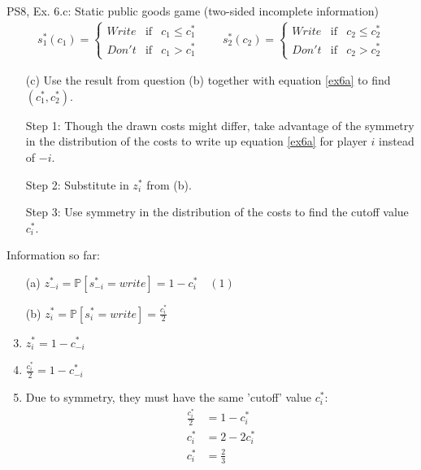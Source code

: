 \begin{frame}{PS8, Ex. 6.c: Static public goods game (two-sided incomplete information)}
    \begin{align*}
      s_1^*(c_1)=\left\{\begin{array}{rcl}
        Write & \text{if} & c_1\leq c_1^*\\
        Don't & \text{if} & c_1>c_1^*
        \end{array}\right.\quad\quad
      s_2^*(c_2)=\left\{\begin{array}{rcl}
        Write & \text{if} & c_2\leq c_2^*\\
        Don't & \text{if} & c_2>c_2^*
        \end{array}\right.
    \end{align*}
    \vspace{-8pt}
    \begin{itemize}
      \item[(c)] Use the result from question (b) together with equation \eqref{ex6a} to find $(c_1^* , c_2^*)$.
    \end{itemize}
    \vspace{-4pt}
    \begin{multicols}{2}
      \begin{itemize}
        \item[Step 1:] Though the drawn costs might differ, take advantage of the symmetry in the distribution of the costs to write up equation \eqref{ex6a} for player $i$ instead of $-i$.
        \item[Step 2:] Substitute in $z_i^*$ from (b).
        \item[Step 3:] Use symmetry in the distribution of the costs to find the cutoff value $c_i^*$.
      \end{itemize}
      \vfill\null\columnbreak
      Information so far:
      \begin{enumerate}
        \item[(a)] $z_{-i}^*=\mathbb{P}[s_{-i}^*=write]=1-c_i^*\quad(1)$
        \item[(b)] $z_i^*=\mathbb{P}[s_i^*=write]=\frac{c_i^*}{2}$
        \item      $z_i^*=1-c_{-i}^*$
        \item      $\frac{c_i^*}{2}=1-c_{-i}^*$
        \item      Due to symmetry, they must have the same 'cutoff' value $c_i^*$:\vspace{-8pt}
                   \begin{align*}
                     \frac{c_i^*}{2}&=1-c_{i}^*\\
                     c_i^*&=2-2c_{i}^*\\
                     c_i^*&=\frac{2}{3}
                   \end{align*}
      \end{enumerate}
      \vfill\null
    \end{multicols}
\end{frame}
